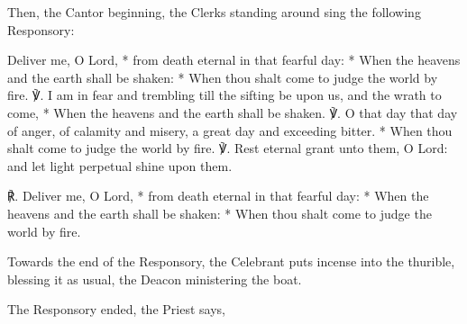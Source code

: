 \begin{rubric}
    Then, the Cantor beginning, the Clerks standing around sing the following Responsory:
\end{rubric}\par\noindent
Deliver me, O Lord, * from death eternal in that fearful day: * When the heavens and the earth shall be shaken: * When thou shalt come to judge the world by fire. ℣. I am in fear and trembling till the sifting be upon us, and the wrath to come, * When the heavens and the earth shall be shaken. ℣. O that day that day of anger, of calamity and misery, a great day and exceeding bitter. * When thou shalt come to judge the world by fire. ℣. Rest eternal grant unto them, O Lord: and let light perpetual shine upon them.\par
℟. Deliver me, O Lord, * from death eternal in that fearful day: * When the heavens and the earth shall be shaken: * When thou shalt come to judge the world by fire.

\begin{rubric}
    Towards the end of the Responsory, the Celebrant puts incense into the thurible, blessing it as usual, the Deacon ministering the boat.
\end{rubric}
\begin{rubric}
	The Responsory ended, the Priest says,
\end{rubric}


